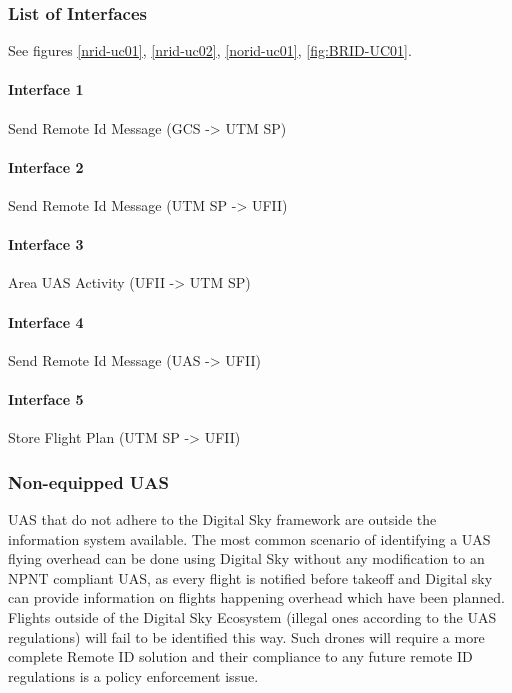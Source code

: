 \documentclass{ua_wgs_base}
\begin{document}
\subsubsection{List of Interfaces}

See figures \ref{nrid-uc01}, \ref{nrid-uc02}, \ref{norid-uc01},
\ref{fig:BRID-UC01}.

\paragraph{Interface 1}

Send Remote Id Message (GCS -> UTM SP) 

\paragraph{Interface 2}

Send Remote Id Message (UTM SP -> UFII) 

\paragraph{Interface 3}

Area UAS Activity (UFII -> UTM SP) 

\paragraph{Interface 4}

Send Remote Id Message (UAS -> UFII) 

\paragraph{Interface 5}

Store Flight Plan (UTM SP -> UFII)


\subsubsection{Non-equipped UAS}

UAS that do not adhere to the Digital Sky framework are outside the
information system available. The most common scenario of identifying
a UAS flying overhead can be done using Digital Sky without any modification
to an NPNT compliant UAS, as every flight is notified before takeoff
and Digital sky can provide information on flights happening overhead
which have been planned. Flights outside of the Digital Sky Ecosystem
(illegal ones according to the UAS regulations) will fail to be identified
this way. Such drones will require a more complete Remote ID solution
and their compliance to any future remote ID regulations is a policy
enforcement issue. 
\end{document}
